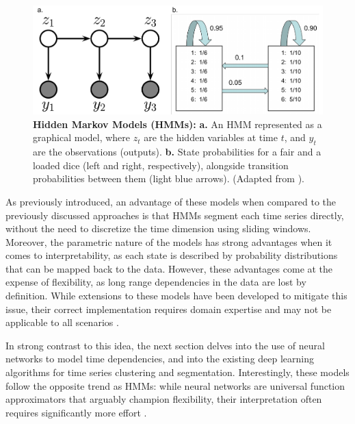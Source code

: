 \begin{figure}[!thb]
\centering
\includegraphics[width=\textwidth]{Figures/sota_4.pdf}

\caption[\textbf{Hidden Markov Models (HMMs)}]{\textbf{Hidden Markov Models (HMMs):} \textbf{a.} An HMM represented as a graphical model, where $z_t$ are the hidden variables at time $t$, and $y_t$ are the observations (outputs). \textbf{b.} State probabilities for a fair and a loaded dice (left and right, respectively), alongside transition probabilities between them (light blue arrows). (Adapted from \cite{Murphy2023ProbabilisticTopics}).}
\label{fig:2.4}

\end{figure}

As previously introduced, an advantage of these models when compared to the previously discussed approaches is that HMMs segment each time series directly, without the need to discretize the time dimension using sliding windows. Moreover, the parametric nature of the models has strong advantages when it comes to interpretability, as each state is described by probability distributions that can be mapped back to the data. However, these advantages come at the expense of flexibility, as long range dependencies in the data are lost by definition. While extensions to these models have been developed to mitigate this issue, their correct implementation requires domain expertise and may not be applicable to all scenarios \cite{Weinreb2023Keypoint-MoSeq:Dynamics, Mor2021AApplications}.

In strong contrast to this idea, the next section delves into the use of neural networks to model time dependencies, and into the existing deep learning algorithms for time series clustering and segmentation. Interestingly, these models follow the opposite trend as HMMs: while neural networks are universal function approximators that arguably champion flexibility, their interpretation often requires significantly more effort \cite{Roberts2021TheTheory}.

